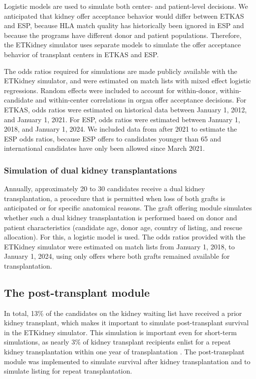 \documentclass[11pt,twoside,]{book}
\begin{document}
Logistic models are used to simulate both center- and patient-level decisions. We anticipated
that kidney offer acceptance behavior would differ between ETKAS and ESP,
because HLA match quality has historically been ignored in ESP and because
the programs have different donor and patient populations. Therefore, the
ETKidney simulator uses separate models to simulate the offer acceptance behavior
of transplant centers in ETKAS and ESP.

The odds ratios required for simulations are made publicly available with
the ETKidney simulator, and were estimated on match lists with mixed
effect logistic regressions. Random effects were included to account for
within-donor, within-candidate and within-center correlations in organ
offer acceptance decisions. For ETKAS, odds ratios
were estimated on historical data between January 1, 2012, and January 1, 2021. For
ESP, odds ratios were estimated between January 1, 2018, and January 1, 2024. We
included data from after 2021 to estimate the ESP odds ratios, because ESP
offers to candidates younger than 65 and international candidates have only
been allowed since March 2021.

\subsubsection{Simulation of dual kidney transplantations}\label{sec:dkt}

Annually, approximately 20 to 30 candidates receive a dual kidney
transplantation, a procedure that is permitted when loss of both grafts
is anticipated or for specific anatomical reasons. The graft offering module
simulates whether such a dual kidney transplantation is performed based on donor
and patient characteristics (candidate age,
donor age, country of listing, and rescue allocation). For this, a
logistic model is used. The odds ratios provided with the ETKidney
simulator were estimated on match lists from January 1, 2018, to January 1, 2024,
using only offers where both grafts remained available for transplantation.

\subsection{The post-transplant module}\label{sec:etkidneyposttxp}

In total, 13\% of the candidates on the kidney waiting list have received
a prior kidney transplant, which makes it important to simulate post-transplant
survival in the ETKidney simulator. This simulation is important even for short-term
simulations, as nearly 3\% of kidney transplant recipients
enlist for a repeat kidney transplantation within one year of transplantation
\citep{eurotransplantinternationalfoundationWaitingListRegistrations2024}.
The post-transplant module was implemented to simulate survival after kidney
transplantation and to simulate listing for repeat transplantation.
\vfill
\end{document}

